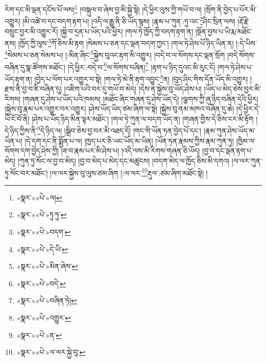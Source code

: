རེག་དང་མི་ལྡན་དངོས་པོ་ལས།\footnote{«སྣར་»«པེ་»ལ།} །བསྐུལ་བ་ཞེས་བྱ་མི་སྐྱེ་སྟེ། །དེ་ཕྱིར་ལུས་ཀྱི་གཡོ་བ་ལ། །སྲོག་ནི་བྱེད་པ་པོར་མི་འགྱུར། །མི་འཚེ་བ་དང་བདག་རྟག་པ། །འདི་ལ་རྒྱུ་ནི་ཅི་ཡོད་སྙམ། །རྣམ་པ་ཀུན་:ཏུ་འང་\footnote{«སྣར་»«པེ་»ཏུ་ཏུ་}ཤིང་སྲིན་ལས། །རྡོ་རྗེ་བསྲུང་བྱར་མི་འགྱུར་རོ། །སྐྱེ་བ་དྲན་པ་ཡོད་པའི་ཕྱིར། །གལ་ཏེ་ཁྱོད་ཀྱི་བདག་རྟག་ན། །སྔོན་བྱས་པ་ཡི་རྨ་མཐོང་ནས། །ཁྱོད་ཀྱི་ལུས་\footnote{«སྣར་»«པེ་»བདག་}ཀོ་ཅིས་མི་རྟག །སེམས་པ་ཅན་དང་ལྡན་བདག་ཀྱང་། །གལ་ཏེ་ཤེས་པོ་ཉིད་ཡིན་ན། །:དེ་ཡིས་\footnote{«སྣར་»«པེ་»དེ་ཡི་}སེམས་པ་ཅན་སེམས་པ། །:མིན་ཞིང་\footnote{«སྣར་»«པེ་»མིན་ཞེས་}སྐྱེས་བུའང་རྟག་མི་འགྱུར། །བདེ་བ་ལ་སོགས་དང་ལྡན་སྲོག །བདེ་སོགས་བཞིན་དུ་སྣ་ཚོགས་མཐོང་། །དེ་ཕྱིར་:བདེ་བ་\footnote{«སྣར་»«པེ་»བདེ་}ལ་སོགས་བཞིན།\footnote{«སྣར་»«པེ་»བཞིན་ཏེ།} །རྟག་པ་ཉིད་དུའང་མི་རུང་ངོ། །གལ་ཏེ་ཤེས་པ་ཡོད་རྟག་ན། །བྱེད་པ་ལོག་པར་འགྱུར་བ་སྟེ། །གལ་ཏེ་མེ་ནི་རྟག་འབྱུང་\footnote{«སྣར་»«པེ་»འགྱུར་}ན། །བུད་ཤིང་གིས་དོན་ཡོད་མི་འགྱུར། །རྫས་ནི་བྱ་བ་ཇི་བཞིན་དུ། །འཇིག་པའི་བར་དུ་གཡོ་བ་མེད། །དེས་ན་སྐྱེས་བུ་ཡོད་ཤེས་པ། །ཡོད་པ་མེད་ཅེས་བྱར་མི་རིགས། །གཞན་དུ་ཤེས་པ་ཡོད་པའི་ཁམས། །མཐོང་ཞིང་གཞན་དུ་ཤེས་ཡོད་དེ། །ལྕགས་ཀྱི་ཞུ་ཉིད་བཞིན་དེའི་ཕྱིར། །སྐྱེས་བུ་རྣམ་པར་འགྱུར་བར་འགྱུར། །ཤེས་ཡོད་ཡིད་ཙམ་ཞིག་ལ་སྟེ། །སྐྱེས་བུ་ནམ་མཁའ་བཞིན་དུ་ཆེ། །དེ་ཕྱིར་དེ་ཡི་ངོ་བོ་ནི། །ཤེས་པ་ཡོད་ཉིད་མིན་ལྟར་མཐོང་། །གལ་ཏེ་ཀུན་ལ་བདག་ཡོད་ན། །གཞན་གྱིས་དེ་ཅིས་ངར་མི་རྟོག །དེ་ཉིད་ཀྱིས་ནི་\footnote{«སྣར་»«པེ་»ན་}དེ་ཉིད་ལ། །སྒྲིབ་ཅེས་བྱ་བར་མི་འཐད་དོ། །གང་གི་ཡོན་ཏན་བྱེད་པོ་དང་། །རྣམ་ཀུན་ཤེས་ཡོད་མ་ཡིན་པ། །དེ་དག་དང་ནི་སྨྱོན་པ་ལ། །ཁྱད་པར་ཅི་ཡང་ཡོད་མ་ཡིན། །ཡོན་ཏན་རྣམས་ཀྱིས་རྣམ་ཀུན་ཏུ། །ཁྱིམ་ལ་སོགས་དག་བྱེད་ཤེས་ཀྱི། །ཟ་བ་རྣམ་པར་མི་ཤེས་པ། །འདི་ལས་མི་རིགས་གཞན་ཅི་ཡོད། །བྱ་བ་དང་ལྡན་རྟག་པ་མེད། །ཀུན་ཏུ་སོང་ལ་བྱ་བ་མེད། །བྱ་བ་མེད་པ་མེད་དང་མཚུངས། །བདག་མེད་ལ་ཁྱོད་ཅིས་མི་དགའ། །ལ་ལར་ཀུན་ཏུ་སོང་བར་མཐོང་། །ལ་ལར་སྐྱེས་བུ་ལུས་ཙམ་ཞིག །:ལ་ལར་\footnote{«སྣར་»«པེ་»ལ་ལར་སྐྱེ་བུ་}རྡུལ་:ཙམ་ཞིག་མཐོང་སྟེ། །
